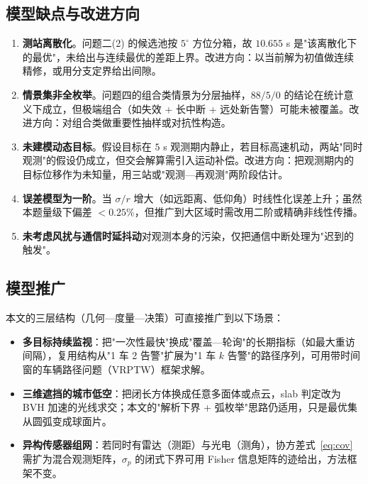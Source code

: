 \documentclass[UTF8,a4paper,zihao=-4,oneside]{ctexart}
\begin{document}
\subsection{模型缺点与改进方向}

\begin{enumerate}[leftmargin=2em]
  \item \textbf{测站离散化}。问题二(2) 的候选池按 $5^\circ$ 方位分箱，故 $10.655$ s 是"该离散化下的最优"，未给出与连续最优的差距上界。改进方向：以当前解为初值做连续精修，或用分支定界给出间隙。
  \item \textbf{情景集非全枚举}。问题四的组合类情景为分层抽样，$88/5/0$ 的结论在统计意义下成立，但极端组合（如失效 + 长中断 + 远处新告警）可能未被覆盖。改进方向：对组合类做重要性抽样或对抗性构造。
  \item \textbf{未建模动态目标}。假设目标在 $5$ s 观测期内静止，若目标高速机动，两站"同时观测"的假设仍成立，但交会解算需引入运动补偿。改进方向：把观测期内的目标位移作为未知量，用三站或"观测—再观测"两阶段估计。
  \item \textbf{误差模型为一阶}。当 $\sigma/r$ 增大（如远距离、低仰角）时线性化误差上升；虽然本题量级下偏差 $<0.25\%$，但推广到大区域时需改用二阶或精确非线性传播。
  \item \textbf{未考虑风扰与通信时延抖动}对观测本身的污染，仅把通信中断处理为"迟到的触发"。
\end{enumerate}

\subsection{模型推广}

本文的三层结构（几何—度量—决策）可直接推广到以下场景：
\begin{itemize}[leftmargin=2em]
  \item \textbf{多目标持续监视}：把"一次性最快"换成"覆盖—轮询"的长期指标（如最大重访间隔），复用结构从"1 车 2 告警"扩展为"1 车 $k$ 告警"的路径序列，可用带时间窗的车辆路径问题（VRPTW）框架求解。
  \item \textbf{三维遮挡的城市低空}：把闭长方体换成任意多面体或点云，slab 判定改为 BVH 加速的光线求交；本文的"解析下界 + 弧枚举"思路仍适用，只是最优集从圆弧变成球面片。
  \item \textbf{异构传感器组网}：若同时有雷达（测距）与光电（测角），协方差式~\eqref{eq:cov} 需扩为混合观测矩阵，$\sigma_p$ 的闭式下界可用 Fisher 信息矩阵的迹给出，方法框架不变。
\end{itemize}


\end{document}
